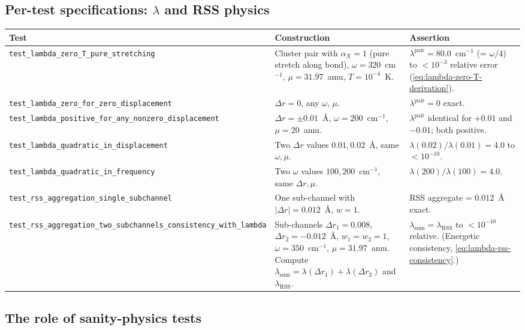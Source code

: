 \documentclass[10pt,a4paper,twoside]{article}
\begin{document}
\subsection{Per-test specifications: $\lambda$ and RSS physics}

\begin{longtable}{p{} p{} p{}}
\toprule
\textbf{Test} & \textbf{Construction} & \textbf{Assertion} \\
\midrule
\texttt{test\_lambda\_zero\_T\_pure\_stretching}
 & Cluster pair with $\alpha_X = 1$ (pure stretch along bond),
   $\omega = 320$~cm$^{-1}$, $\mu = 31.97$~amu, $T = 10^{-4}$~K.
 & $\lambda^\text{pair} = 80.0$~cm$^{-1}$ (= $\omega/4$) to
   $< 10^{-3}$ relative error
   (\cref{eq:lambda-zero-T-derivation}). \\
\midrule
\texttt{test\_lambda\_zero\_for\_zero\_displacement}
 & $\Delta r = 0$, any $\omega$, $\mu$.
 & $\lambda^\text{pair} = 0$ exact. \\
\midrule
\texttt{test\_lambda\_positive\_for\_any\_nonzero\_displacement}
 & $\Delta r = \pm 0.01$~\AA{}, $\omega = 200$~cm$^{-1}$,
   $\mu = 20$~amu.
 & $\lambda^\text{pair}$ identical for $+0.01$ and $-0.01$;
   both positive. \\
\midrule
\texttt{test\_lambda\_quadratic\_in\_displacement}
 & Two $\Delta r$ values $0.01, 0.02$~\AA{}, same $\omega, \mu$.
 & $\lambda(0.02) / \lambda(0.01) = 4.0$ to $< 10^{-10}$. \\
\midrule
\texttt{test\_lambda\_quadratic\_in\_frequency}
 & Two $\omega$ values $100, 200$~cm$^{-1}$, same $\Delta r, \mu$.
 & $\lambda(200) / \lambda(100) = 4.0$. \\
\midrule
\texttt{test\_rss\_aggregation\_single\_subchannel}
 & One sub-channel with $|\Delta r| = 0.012$~\AA{}, $w = 1$.
 & RSS aggregate = $0.012$~\AA{} exact. \\
\midrule
\texttt{test\_rss\_aggregation\_two\_subchannels\_consistency\_with\_lambda}
 & Sub-channels $\Delta r_1 = 0.008$, $\Delta r_2 = -0.012$~\AA{},
   $w_1 = w_2 = 1$, $\omega = 350$~cm$^{-1}$, $\mu = 31.97$~amu.
   Compute $\lambda_\text{sum} = \lambda(\Delta r_1) +
   \lambda(\Delta r_2)$ and $\lambda_\text{RSS}$.
 & $\lambda_\text{sum} = \lambda_\text{RSS}$ to $< 10^{-10}$
   relative. (Energetic consistency,
   \cref{eq:lambda-rss-consistency}.) \\
\bottomrule
\end{longtable}

\subsection{The role of sanity-physics tests}
\end{document}
